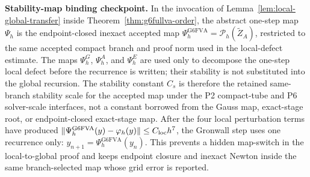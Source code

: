 \documentclass[preprint,12pt]{elsarticle}
\begin{document}
\noindent\textbf{Stability-map binding checkpoint.}
In the invocation of Lemma~\ref{lem:local-global-transfer} inside
Theorem~\ref{thm:g6fullva-order}, the abstract one-step map \(\Psi_h\) is
the endpoint-closed inexact accepted map
\(\Psi_h^{\mathrm{G6FVA}}=\mathcal P_h(\widetilde Z_A)\), restricted to the
same accepted compact branch and proof norm used in the local-defect
estimate.  The maps \(\Psi_h^G\), \(\Psi_h^A\), and \(\Psi_h^E\) are used
only to decompose the one-step local defect before the recurrence is written;
their stability is not substituted into the global recursion.  The stability
constant \(C_s\) is therefore the retained same-branch stability scale for the
accepted map under the P2 compact-tube and P6 solver-scale interfaces, not a
constant borrowed from the Gauss map, exact-stage root, or endpoint-closed
exact-stage map.  After the four local perturbation terms have produced
\(\|\Psi_h^{\mathrm{G6FVA}}(y)-\varphi_h(y)\|\le C_{\rm loc}h^7\), the
Gronwall step uses one recurrence only:
\(y_{n+1}=\Psi_h^{\mathrm{G6FVA}}(y_n)\).  This prevents a hidden
map-switch in the local-to-global proof and keeps endpoint closure and
inexact Newton inside the same branch-selected map whose grid error is
reported.
\end{document}
